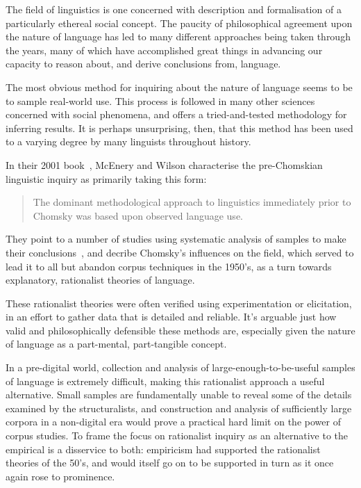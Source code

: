 

The field of linguistics is one concerned with description and formalisation of a particularly ethereal social concept.  The paucity of philosophical agreement upon the nature of language has led to many different approaches being taken through the years, many of which have accomplished great things in advancing our capacity to reason about, and derive conclusions from, language.


The most obvious method for inquiring about the nature of language seems to be to sample real-world use.  This process is followed in many other sciences concerned with social phenomena, and offers a tried-and-tested methodology for inferring results.  It is perhaps unsurprising, then, that this method has been used to a varying degree by many linguists throughout history.

In their 2001 book~\cite{macenery2001corpus}, McEnery and Wilson characterise the pre-Chomskian linguistic inquiry as primarily taking this form:

\begin{quote}
The dominant methodological approach to linguistics immediately prior to Chomsky was based upon observed language use.
\end{quote}

They point to a number of studies using systematic analysis of samples to make their conclusions~\cite{kaeding1897haufigkeitsworterbuch,preyer1889mind,stern1924psychology,eaton1940semantic,west1953general}, and decribe Chomsky's influences on the field, which served to lead it to all but abandon corpus techniques in the 1950's, as a turn towards explanatory, rationalist theories of language.

These rationalist theories were often verified using experimentation or elicitation, in an effort to gather data that is detailed and reliable.  It's arguable just how valid and philosophically defensible these methods are, especially given the nature of language as a part-mental, part-tangible concept.%



In a pre-digital world, collection and analysis of large-enough-to-be-useful samples of language is extremely difficult, making this rationalist approach a useful alternative.
Small samples are fundamentally unable to reveal some of the details examined by the structuralists, and construction and analysis of sufficiently large corpora in a non-digital era would prove a practical hard limit on the power of corpus studies.  To frame the focus on rationalist inquiry as an alternative to the empirical is a disservice to both: empiricism had supported the rationalist theories of the 50's, and would itself go on to be supported in turn as it once again rose to prominence.

